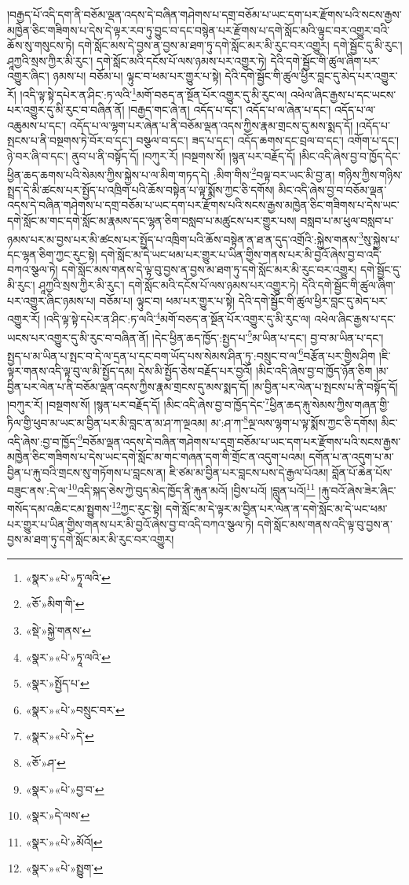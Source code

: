།བརྒྱད་པོ་འདི་དག་ནི་བཅོམ་ལྡན་འདས་དེ་བཞིན་གཤེགས་པ་དགྲ་བཅོམ་པ་ཡང་དག་པར་རྫོགས་པའི་སངས་རྒྱས་མཁྱེན་ཅིང་གཟིགས་པ་དེས་དེ་ལྟར་རབ་ཏུ་བྱུང་བ་དང་བསྙེན་པར་རྫོགས་པ་དགེ་སློང་མའི་ལྟུང་བར་འགྱུར་བའི་ཆོས་སུ་གསུངས་ཏེ། དགེ་སློང་མས་དེ་བྱས་ན་བྱས་མ་ཐག་ཏུ་དགེ་སློང་མར་མི་རུང་བར་འགྱུར། དགེ་སྦྱོང་དུ་མི་རུང་། ཤཱཀྱའི་སྲས་ཀྱིར་མི་རུང་། དགེ་སློང་མའི་དངོས་པོ་ལས་ཉམས་པར་འགྱུར་ཏེ། དེའི་དགེ་སྦྱོང་གི་ཚུལ་ཞིག་པར་འགྱུར་ཞིང་། ཉམས་པ། བཅོམ་པ། ལྟུང་བ་ཕམ་པར་གྱུར་པ་སྟེ། དེའི་དགེ་སྦྱོང་གི་ཚུལ་ཕྱིར་བླང་དུ་མེད་པར་འགྱུར་རོ། །འདི་ལྟ་སྟེ་དཔེར་ན་ཤིང་:ཏ་ལའི་\footnote{«སྣར་»«པེ་»ཏཱ་ལའི་}མགོ་བཅད་ན་སྔོན་པོར་འགྱུར་དུ་མི་རུང་ལ། འཕེལ་ཞིང་རྒྱས་པ་དང་ཡངས་པར་འགྱུར་དུ་མི་རུང་བ་བཞིན་ནོ། །བརྒྱད་གང་ཞེ་ན། འདོད་པ་དང་། འདོད་པ་ལ་ཞེན་པ་དང་། འདོད་པ་ལ་འཆུམས་པ་དང་། འདོད་པ་ལ་ལྷག་པར་ཞེན་པ་ནི་བཅོམ་ལྡན་འདས་ཀྱིས་རྣམ་གྲངས་དུ་མས་སྨད་དོ། །འདོད་པ་སྤངས་པ་ནི་བསྔགས་ཏེ་བོར་བ་དང་། བསྩལ་བ་དང་། ཟད་པ་དང་། འདོད་ཆགས་དང་བྲལ་བ་དང་། འགོག་པ་དང་། ཉེ་བར་ཞི་བ་དང་། ནུབ་པ་ནི་བསྟོད་དོ། །བཀུར་རོ། །བསྔགས་སོ། །སྙན་པར་བརྗོད་དོ། །མིང་འདི་ཞེས་བྱ་བ་ཁྱོད་དེང་ཕྱིན་ཆད་ཆགས་པའི་སེམས་ཀྱིས་སྐྱེས་པ་ལ་མིག་གཏད་དེ། :མིག་གིས་\footnote{«ཅོ་»མིག་གི་}བལྟ་བར་ཡང་མི་བྱ་ན། གཉིས་ཀྱིས་གཉིས་སྤྲད་དེ་མི་ཚངས་པར་སྤྱོད་པ་འཁྲིག་པའི་ཆོས་བསྟེན་པ་ལྟ་སྨོས་ཀྱང་ཅི་དགོས། མིང་འདི་ཞེས་བྱ་བ་བཅོམ་ལྡན་འདས་དེ་བཞིན་གཤེགས་པ་དགྲ་བཅོམ་པ་ཡང་དག་པར་རྫོགས་པའི་སངས་རྒྱས་མཁྱེན་ཅིང་གཟིགས་པ་དེས་ཡང་དགེ་སློང་མ་གང་དགེ་སློང་མ་རྣམས་དང་ལྷན་ཅིག་བསླབ་པ་མཚུངས་པར་གྱུར་པས། བསླབ་པ་མ་ཕུལ་བསླབ་པ་ཉམས་པར་མ་བྱས་པར་མི་ཚངས་པར་སྤྱོད་པ་འཁྲིག་པའི་ཆོས་བསྟེན་ན་ཐ་ན་དུད་འགྲོའི་:སྐྱེས་གནས་\footnote{«སྡེ་»སྐྱེ་གནས་}སུ་སྐྱེས་པ་དང་ལྷན་ཅིག་ཀྱང་རུང་སྟེ། དགེ་སློང་མ་དེ་ཡང་ཕམ་པར་གྱུར་པ་ཡིན་གྱིས་གནས་པར་མི་བྱའོ་ཞེས་བྱ་བ་འདི་བཀའ་སྩལ་ཏེ། དགེ་སློང་མས་གནས་དེ་ལྟ་བུ་བྱས་ན་བྱས་མ་ཐག་ཏུ་དགེ་སློང་མར་མི་རུང་བར་འགྱུར། དགེ་སྦྱོང་དུ་མི་རུང་། ཤཱཀྱའི་སྲས་ཀྱིར་མི་རུང་། དགེ་སློང་མའི་དངོས་པོ་ལས་ཉམས་པར་འགྱུར་ཏེ། དེའི་དགེ་སྦྱོང་གི་ཚུལ་ཞིག་པར་འགྱུར་ཞིང་ཉམས་པ། བཅོམ་པ། ལྟུང་བ། ཕམ་པར་གྱུར་པ་སྟེ། དེའི་དགེ་སྦྱོང་གི་ཚུལ་ཕྱིར་བླང་དུ་མེད་པར་འགྱུར་རོ། །འདི་ལྟ་སྟེ་དཔེར་ན་ཤིང་:ཏ་ལའི་\footnote{«སྣར་»«པེ་»ཏཱ་ལའི་}མགོ་བཅད་ན་སྔོན་པོར་འགྱུར་དུ་མི་རུང་ལ། འཕེལ་ཞིང་རྒྱས་པ་དང་ཡངས་པར་འགྱུར་དུ་མི་རུང་བ་བཞིན་ནོ། །དེང་ཕྱིན་ཆད་ཁྱོད་:སྤྱད་པ་\footnote{«སྣར་»སྤྱོད་པ་}མ་ཡིན་པ་དང་། བྱ་བ་མ་ཡིན་པ་དང་། སྤྱད་པ་མ་ཡིན་པ་སྤང་བ་དེ་ལ་དྲན་པ་དང་བག་ཡོད་པས་སེམས་ཤིན་ཏུ་:བསྲུང་བ་ལ་\footnote{«སྣར་»«པེ་»བསྲུང་བར་}བརྩོན་པར་གྱིས་ཤིག །ཇི་ལྟར་གནས་འདི་ལྟ་བུ་ལ་མི་སྤྱོད་དམ། དེས་མི་སྤྱོད་ཅེས་བརྗོད་པར་བྱའོ། །མིང་འདི་ཞེས་བྱ་བ་ཁྱོད་ཉོན་ཅིག །མ་བྱིན་པར་ལེན་པ་ནི་བཅོམ་ལྡན་འདས་ཀྱིས་རྣམ་གྲངས་དུ་མས་སྨད་དོ། །མ་བྱིན་པར་ལེན་པ་སྤངས་པ་ནི་བསྟོད་དོ། །བཀུར་རོ། །བསྔགས་སོ། །སྙན་པར་བརྗོད་དོ། །མིང་འདི་ཞེས་བྱ་བ་ཁྱོད་དེང་\footnote{«སྣར་»«པེ་»དེ་}ཕྱིན་ཆད་རྐུ་སེམས་ཀྱིས་གཞན་གྱི་ཏིལ་གྱི་ཕུབ་མ་ཡང་མ་བྱིན་པར་མི་བླང་ན་མ་ཤ་ཀ་ལྔའམ། མ་:ཤ་ཀ་\footnote{«ཅོ་»ཤ་}ལྔ་ལས་ལྷག་པ་ལྟ་སྨོས་ཀྱང་ཅི་དགོས། མིང་འདི་ཞེས་:བྱ་བ་ཁྱོད་\footnote{«སྣར་»«པེ་»བྱ་བ་}བཅོམ་ལྡན་འདས་དེ་བཞིན་གཤེགས་པ་དགྲ་བཅོམ་པ་ཡང་དག་པར་རྫོགས་པའི་སངས་རྒྱས་མཁྱེན་ཅིང་གཟིགས་པ་དེས་ཡང་དགེ་སློང་མ་གང་གཞན་དག་གི་གྲོང་ན་འདུག་པའམ། དགོན་པ་ན་འདུག་པ་མ་བྱིན་པ་རྐུ་བའི་གྲངས་སུ་གཏོགས་པ་བླངས་ན། ཇི་ཙམ་མ་བྱིན་པར་བླངས་པས་དེ་རྒྱལ་པོའམ། བློན་པོ་ཆེན་པོས་བཟུང་ནས་:དེ་ལ་\footnote{«སྣར་»དེ་ལས་}འདི་སྐད་ཅེས་ཀྱེ་བུད་མེད་ཁྱོད་ནི་རྐུན་མའོ། །བྱིས་པའོ། །བླུན་པའོ།\footnote{«སྣར་»«པེ་»མོའོ།} །རྐུ་བའོ་ཞེས་ཟེར་ཞིང་གསོད་དམ་འཆིང་ངམ་སྤྱུགས་\footnote{«སྣར་»«པེ་»སྤྱུག་}ཀྱང་རུང་སྟེ། དགེ་སློང་མ་དེ་ལྟར་མ་བྱིན་པར་ལེན་ན་དགེ་སློང་མ་དེ་ཡང་ཕམ་པར་གྱུར་པ་ཡིན་གྱིས་གནས་པར་མི་བྱའོ་ཞེས་བྱ་བ་འདི་བཀའ་སྩལ་ཏེ། དགེ་སློང་མས་གནས་འདི་ལྟ་བུ་བྱས་ན་བྱས་མ་ཐག་ཏུ་དགེ་སློང་མར་མི་རུང་བར་འགྱུར། 